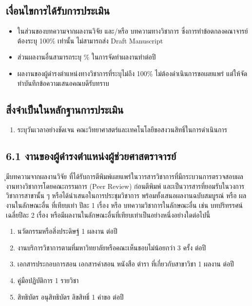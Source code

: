 \documentclass[a4paper,12pt,english]{sphinxmanual}
\begin{document}
\subsection{เงื่อนไขการได้รับการประเมิน}
\label{\detokenize{workload_rubric:id99}}\begin{itemize}
\item {} 
ในส่วนของบทความจากผลงานวิจัย และ/หรือ บทความทางวิชาการ ซึ่งการทำข้อตกลงคณาจารย์ต้องระบุ 100\% เท่านั้น ไม่สามารถส่ง Draft Manuscript

\item {} 
ส่วนผลงานอื่นสามารถระบุ \% ในการจัดทำผลงานทำต่อปี

\item {} 
ผลงานของผู้ดำรงตำแหน่งทางวิชาการที่ระบุไม่ถึง 100\% ไม่ต้องดำเนินการขอเผยแพร่ แต่ให้จัดทำบันทึกข้อความเสนอคณบดีรับทราบ

\end{itemize}


\subsection{สิ่งจำเป็นในหลักฐานการประเมิน}
\label{\detokenize{workload_rubric:id100}}\begin{enumerate}
%
\item {} 
 ระบุวันเวลาอย่างชัดเจน คณะวิทยาศาสตร์และเทคโนโลยีขอสงวนสิทธิ์ในการดำเนินการ

\end{enumerate}


\subsection{6.1 งานของผู้ดำรงตำแหน่งผู้ช่วยศาสตราจารย์}
\label{\detokenize{workload_rubric:id101}}
ุมีบทความจากผลงานวิจัย ที่ได้รับการตีพิมพ์เผยแพร่ในวารสารวิชาการที่มีกระบวนการตรวจสอบผลงานทางวิชาการโดยคณะกรรมการ (Peer Review) ก่อนตีพิมพ์ และเป็นวารสารที่ยอมรับในวงการวิชาการสาขานั้น ๆ หรือได้นำเสนอในการประชุมวิชาการ พร้อมทั้งเสนอผลงานฉบับสมบูรณ์ หรือ ผลงานในลักษณะอื่น ที่เทียบเท่า ปีละ 1 เรื่อง หรือ บทความวิชาการในลักษณะอื่น เช่น บทปริทรรศน์ เฉลี่ยปีละ 2 เรื่อง หรือมีผลงานในลักษณะอื่นที่เทียบเท่าเป็นอย่างหนึ่งอย่างใดต่อไปนี้
\begin{enumerate}
%
\item {} 
นวัตกรรมหรือสิ่งประดิษฐ์ 1 ผลงาน ต่อปี

\item {} 
งานบริการวิชาการตามที่มหาวิทยาลัยหรือคณะเห็นชอบไม่น้อยกว่า 3 ครั้ง ต่อปี

\item {} 
เอกสารประกอบการสอน เอกสารคำสอน หนังสือ ตำรา ที่เกี่ยวกับสาขาวิชา 1 ผลงาน ต่อปี

\item {} 
คู่มือปฏิบัติการ 1 รายวิชา

\item {} 
สิทธิบัตร อนุสิทธิบัตร ลิขสิทธิ์ 1 คำขอ ต่อปี

\end{enumerate}
\end{document}
